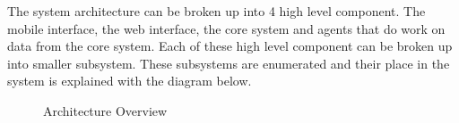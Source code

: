 The system architecture can be broken up into 4 high level component. The mobile interface, the web interface, the core system and agents that do work on data from the core system. Each of these high level component can be broken up into smaller subsystem. These subsystems are enumerated and their place in the system is explained with the diagram below.

\begin{figure}[h]
\caption{Architecture Overview}
\end{figure}
